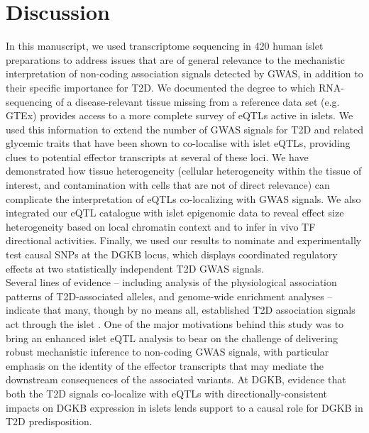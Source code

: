 \section{Discussion}
In this manuscript, we used transcriptome sequencing in 420 human islet preparations to address issues that are of general relevance to the mechanistic interpretation of non-coding association signals detected by GWAS, in addition to their specific importance for T2D. We documented the degree to which RNA-sequencing of a disease-relevant tissue missing from a reference data set (e.g. GTEx) provides access to a more complete survey of eQTLs active in islets. We used this information to extend the number of GWAS signals for T2D and related glycemic traits that have been shown to co-localise with islet eQTLs, providing clues to potential effector transcripts at several of these loci.  We have demonstrated how tissue heterogeneity (cellular heterogeneity within the tissue of interest, and contamination with cells that are not of direct relevance) can complicate the interpretation of eQTLs co-localizing with GWAS signals. We also integrated our eQTL catalogue with islet epigenomic data to reveal effect size heterogeneity based on local chromatin context and to infer in vivo TF directional activities. Finally, we used our results to nominate and experimentally test causal SNPs at the DGKB locus, which displays coordinated regulatory effects at two statistically independent T2D GWAS signals. \\

Several lines of evidence – including analysis of the physiological association patterns of T2D-associated alleles, and genome-wide enrichment analyses – indicate that many, though by no means all, established T2D association signals act through the islet \cite{woodGenomeWideAssociationStudy2017, vaisseMelanocortin4ReceptorMutations2000, moltkeCommonGreenlandicTBC1D42014, saxenaGenomeWideAssociationAnalysis2007}. One of the major motivations behind this study was to bring an enhanced islet eQTL analysis to bear on the challenge of delivering robust mechanistic inference to non-coding GWAS signals, with particular emphasis on the identity of the effector transcripts that may mediate the downstream consequences of the associated variants. At DGKB, evidence that both the T2D signals co-localize with eQTLs with directionally-consistent impacts on DGKB expression in islets lends support to a causal role for DGKB in T2D predisposition. \\

